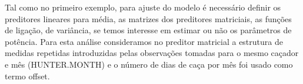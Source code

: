 \begin{knitrout}
\color{fgcolor}\begin{kframe}
\begin{alltt}
\hlstd{(}\hlstd{,}  \hlstd{=} \hlstd{)}
\end{alltt}
\end{kframe}
\end{knitrout}

Tal como no primeiro exemplo, para ajuste do modelo é necessário definir os preditores lineares para média, as matrizes dos preditores matriciais, as funções de ligação, de variância, se temos interesse em estimar ou não os parâmetros de potência. Para esta análise consideramos no preditor matricial a estrutura de medidas repetidas introduzidas pelas observações tomadas para o mesmo caçador e mês (HUNTER.MONTH) e o número de dias de caça por mês foi usado como termo offset.

\begin{knitrout}
\color{fgcolor}\begin{kframe}
\begin{alltt}
 \hlkwb{<-}  \hlopt{~}  \hlopt{*} 
 \hlkwb{<-}  \hlopt{~}  \hlopt{*} 

 \hlkwb{<-} 
 \hlkwb{<-} \hlstd{(}\hlopt{~}  \hlopt{+}   

 \hlkwb{<-} \hlstd{(} \hlstd{=} 
              \hlstd{=} \hlstd{(}
              \hlstd{=} \hlstd{(}\hlstd{,} \hlstd{),}
              \hlstd{=} \hlstd{(}\hlstd{,}
                          \hlstd{),}
              \hlstd{=} \hlstd{(}\hlopt{$}
                           \hlopt{$}
              
\end{alltt}
\end{kframe}
\end{knitrout}

